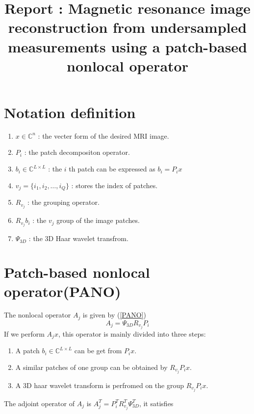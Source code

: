 \documentclass[UTF8]{article}
\begin{document}
\title{Report : Magnetic resonance image reconstruction from undersampled measurements using a patch-based nonlocal operator}
\maketitle

\section{Notation definition}
\begin{enumerate}
\item  $x\in \mathbb{C}^n$ : the vecter form of the desired MRI image.
\item  $P_i$ : the patch decompositon operator.
\item  $b_i \in \mathbb{C}^{L\times L}$ : the $i$ th patch can be expressed as  $b_i=P_i x$
\item  $v_j=\{i_1, i_2, \dots ,i_Q\}$ : stores the index of patches.
\item  $R_{v_j}$ : the grouping operator.
\item  $R_{v_j}b_i$ : the $v_j$ group of the image patches.
\item  $\Psi_{3D}$ : the 3D Haar wavelet transfrom.
\end{enumerate}


\section{Patch-based nonlocal operator(PANO)}
\par The nonlocal operator  $A_j$ is given by (\ref{PANO})
\begin{equation}\label{PANO}
	A_j=\Psi_{3D}R_{v_j}P_i
\end{equation}
If we perform $A_jx$, this operator is mainly divided into three steps:

\begin{enumerate}
	\item A patch $b_i \in \mathbb{C}^{L \times L}$ can be get from $P_i x$.
	\item A similar patches of one group can be obtained by $R_{v_j}P_i x$.
	\item A 3D haar wavelet transform is perfromed on the group $R_{v_j}P_i x$.
\end{enumerate} 
The adjoint operator of $A_j$ is $A_j^T=P_i^TR_{v_j}^T\Psi_{3D}^T$, it satisfies
\end{document}
